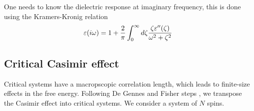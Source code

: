 One needs to know the dielectric response at imaginary frequency, this is done using the Kramers-Kronig relation
\begin{equation}
    \varepsilon(i\omega)= 1 +{2\over \pi}\int_0^\infty d\zeta {\zeta \varepsilon''(\zeta)\over \omega^2 + \zeta^2}
\end{equation}


    \subsection{Critical Casimir effect}

{\color{red}
Critical systems have a macropscopic correlation length, which leads to finite-size effects in the free energy. Following De Gennes and Fisher steps \cite{gambassi_casimir_2009}, we transpose the Casimir effect into critical systems. We consider a system of $N$ spins.
}
